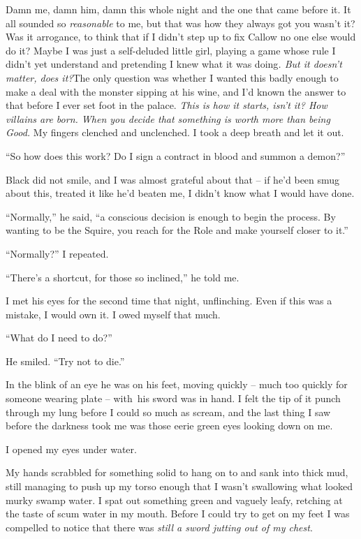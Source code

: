 \documentclass[12pt, openany]{book}
\begin{document}
Damn me, damn him, damn this whole night and the one that came before it. It all sounded so \textit{reasonable} to me, but that was how they always got you wasn’t it? Was it arrogance, to think that if I didn’t step up to fix Callow no one else would do it? Maybe I was just a self-deluded little girl, playing a game whose rule I didn’t yet understand and pretending I knew what it was doing\textit{. But it doesn’t matter, does it?}The only question was whether I wanted this badly enough to make a deal with the monster sipping at his wine, and I’d known the answer to that before I ever set foot in the palace. \textit{This is how it starts, isn’t it? How villains are born. When you decide that something is worth more than being Good.} My fingers clenched and unclenched. I took a deep breath and let it out.

“So how does this work? Do I sign a contract in blood and summon a demon?”

Black did not smile, and I was almost grateful about that – if he’d been smug about this, treated it like he’d beaten me, I didn’t know what I would have done.

“Normally,” he said, “a conscious decision is enough to begin the process. By wanting to be the Squire, you reach for the Role and make yourself closer to it.”

“Normally?” I repeated.

“There’s a shortcut, for those so inclined,” he told me.

I met his eyes for the second time that night, unflinching. Even if this was a mistake, I would own it. I owed myself that much.

“What do I need to do?”

He smiled. “Try not to die.”

In the blink of an eye he was on his feet, moving quickly – much too quickly for someone wearing plate – with his sword was in hand. I felt the tip of it punch through my lung before I could so much as scream, and the last thing I saw before the darkness took me was those eerie green eyes looking down on me.

I opened my eyes under water.

My hands scrabbled for something solid to hang on to and sank into thick mud, still managing to push up my torso enough that I wasn’t swallowing what looked murky swamp water. I spat out something green and vaguely leafy, retching at the taste of scum water in my mouth. Before I could try to get on my feet I was compelled to notice that there was \textit{still a sword jutting out of my chest}.
\end{document}
